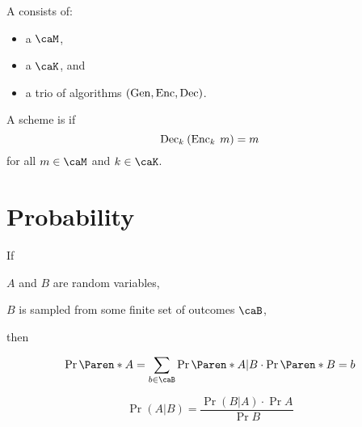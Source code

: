 \documentclass[a5paper]{article}
\begin{document}
\begin{definition}
  A  consists of:
  \begin{itemize}
    \itemsep0em
    \item a  $\caM$,
    \item a  $\caK$, and
    \item a trio of algorithms $(\operatorname{Gen},\operatorname{Enc},\operatorname{Dec})$.
  \end{itemize}
  A scheme is  if
  \begin{equation*}
    \operatorname{Dec}_k\hspace{0.23em} (\operatorname{Enc}_k\hspace{0.23em} m)=m
  \end{equation*}
  for all $m\in\caM$ and $k\in\caK$.
\end{definition}

\section{Probability}
\label{sec:probability}

\begin{lemma}
  If
  \begin{premises}
    \item $A$ and $B$ are random variables,
    \item $B$ is sampled from some finite set of outcomes $\caB$,
  \end{premises}
  then
  \begin{conclusion}
    \begin{equation*}
      \Pr\paren{A}=\sum_{b\in \caB}\Pr\paren{A|B}\cdot\Pr\paren{B=b}
    \end{equation*}
  \end{conclusion}
\end{lemma}

\begin{theorem}
  \begin{equation*}
    \Pr(A|B) = \frac{\Pr(B|A)\cdot \Pr A}{\Pr B}
  \end{equation*}
\end{theorem}
\end{document}

